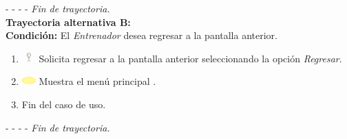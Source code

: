 - - - - \textit{Fin de trayectoria.} \\

\textbf{\large{Trayectoria alternativa B:}}\\
\textbf{Condición: } El \textit{Entrenador} desea regresar a la pantalla anterior.

\begin{enumerate}
	\item \includegraphics[width=15pt, height=10pt]{./Figuras/iconosCU/usuario.png} Solicita regresar a la pantalla anterior seleccionando la opción \textit{Regresar}.
	\item \includegraphics[width=15pt]{./Figuras/iconosCU/herramienta.png} Muestra el menú principal .
	\item Fin del caso de uso.
\end{enumerate}

- - - - \textit{Fin de trayectoria.} \\
\clearpage
